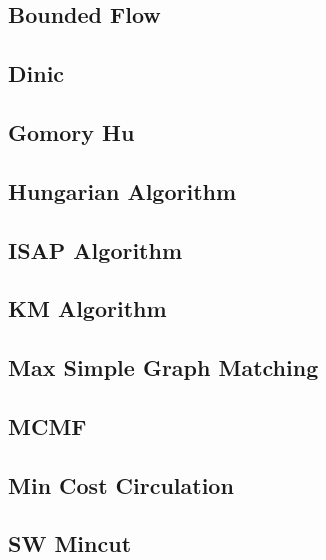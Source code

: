 \documentclass{article}
\begin{document}
\subsection{Bounded Flow}


\subsection{Dinic}


\subsection{Gomory Hu}


\subsection{Hungarian Algorithm}


\subsection{ISAP Algorithm}


\subsection{KM Algorithm}


\subsection{Max Simple Graph Matching}


\subsection{MCMF}


\subsection{Min Cost Circulation}


\subsection{SW Mincut}

\end{document}
